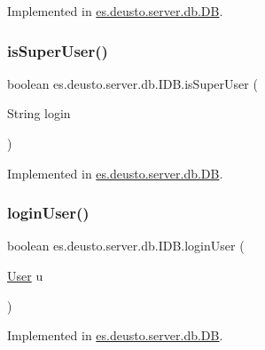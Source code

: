 Implemented in \hyperlink{classes_1_1deusto_1_1server_1_1db_1_1_d_b_a1c471589284782e7ff1190f2b6c2369e}{es.\+deusto.\+server.\+db.\+DB}.

\mbox{\label{interfacees_1_1deusto_1_1server_1_1db_1_1_i_d_b_a279d8a59498d4157f2d20ce7f0c4cfdb}} 
\subsubsection{\texorpdfstring{is\+Super\+User()}{isSuperUser()}}
{\footnotesize\ttfamily boolean es.\+deusto.\+server.\+db.\+I\+D\+B.\+is\+Super\+User (\begin{DoxyParamCaption}\item[{String}]{login }\end{DoxyParamCaption})}



Implemented in \hyperlink{classes_1_1deusto_1_1server_1_1db_1_1_d_b_a53a59425c7690f07861fd5d006f83cbc}{es.\+deusto.\+server.\+db.\+DB}.

\mbox{\label{interfacees_1_1deusto_1_1server_1_1db_1_1_i_d_b_a6e6196e5899fc93134223373ed8363a6}} 
\subsubsection{\texorpdfstring{login\+User()}{loginUser()}}
{\footnotesize\ttfamily boolean es.\+deusto.\+server.\+db.\+I\+D\+B.\+login\+User (\begin{DoxyParamCaption}\item[{\hyperlink{classes_1_1deusto_1_1server_1_1db_1_1data_1_1_user}{User}}]{u }\end{DoxyParamCaption})}



Implemented in \hyperlink{classes_1_1deusto_1_1server_1_1db_1_1_d_b_a8e5744311b5924e740d190673abee104}{es.\+deusto.\+server.\+db.\+DB}.

